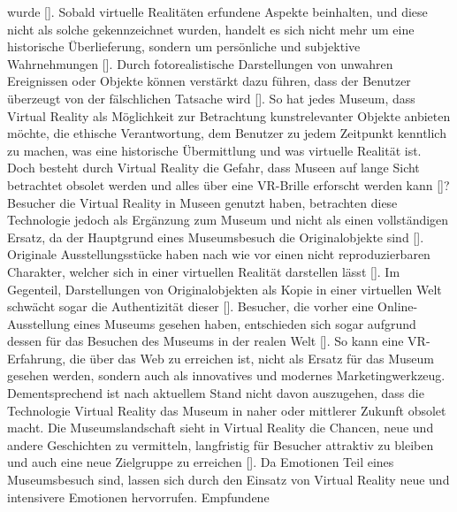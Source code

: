 \documentclass[a4paper,12pt,oneside]{article}
\begin{document}
        wurde [\cite[38]{Heidsiek2019}]. Sobald virtuelle Realitäten erfundene Aspekte 
        beinhalten, und diese nicht als solche gekennzeichnet wurden, handelt es sich nicht
        mehr um eine historische Überlieferung, sondern um persönliche und subjektive 
        Wahrnehmungen [\cite[38]{Heidsiek2019}]. Durch fotorealistische Darstellungen
        von unwahren Ereignissen oder Objekte können verstärkt dazu führen, dass der
        Benutzer überzeugt von der fälschlichen Tatsache wird [\cite[39]{Heidsiek2019}].
        So hat jedes Museum, dass Virtual Reality als Möglichkeit zur Betrachtung 
        kunstrelevanter Objekte anbieten möchte, die ethische Verantwortung, 
        dem Benutzer zu jedem Zeitpunkt kenntlich zu machen,
        was eine historische Übermittlung und was virtuelle Realität ist.
        Doch besteht durch Virtual Reality die Gefahr, dass Museen auf lange Sicht 
        betrachtet obsolet werden und alles über eine VR-Brille erforscht werden kann
        [\cite[142-143]{Huennekens2002}]? Besucher die Virtual Reality in Museen genutzt
        haben, betrachten diese Technologie jedoch als Ergänzung zum Museum und nicht als
        einen vollständigen Ersatz, da der Hauptgrund eines Museumsbesuch die 
        Originalobjekte sind [\cite[79]{Heidsiek2019}]. Originale Ausstellungsstücke
        haben nach wie vor einen nicht reproduzierbaren Charakter, welcher sich in einer
        virtuellen Realität darstellen lässt [\cite[93]{Heidsiek2019}]. Im Gegenteil,
        Darstellungen von Originalobjekten als Kopie in einer virtuellen Welt schwächt
        sogar die Authentizität dieser [\cite[93]{Heidsiek2019}]. 
        Besucher, die vorher eine Online-Ausstellung eines Museums gesehen haben,
        entschieden sich sogar aufgrund dessen für das Besuchen des Museums in der 
        realen Welt [\cite[777-778]{Katz2015}]. So kann eine VR-Erfahrung, die über
        das Web zu erreichen ist, nicht als Ersatz für das Museum gesehen werden,
        sondern auch als innovatives und modernes Marketingwerkzeug.
        Dementsprechend ist nach aktuellem
        Stand nicht davon auszugehen, dass die Technologie Virtual Reality das Museum in
        naher oder mittlerer Zukunft obsolet macht.
        Die Museumslandschaft sieht in Virtual Reality die Chancen, neue und andere
        Geschichten zu vermitteln, langfristig für Besucher attraktiv zu bleiben und
        auch eine neue Zielgruppe zu erreichen [\cite[34-35]{Heidsiek2019}].
        Da Emotionen Teil eines Museumsbesuch sind, lassen sich durch den Einsatz
        von Virtual Reality neue und intensivere Emotionen hervorrufen. Empfundene 
\end{document}
